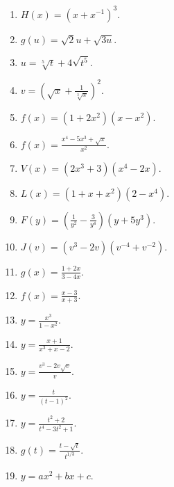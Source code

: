 \begin{problem}
\begin{multicols}{2}
\begin{enumerate}
\item $H(x)=(x+x^{-1})^3$.

\item $g(u)=\sqrt 2 u +\sqrt{3u}$.

\item $u=\sqrt[5]t+4\sqrt{t^5}$.

\item $v=\left(\sqrt{x}+\frac{1}{\sqrt[3]{x}}\right)^2$.


\answer{$ $}
\item $f(x)=(1+2x^2)(x-x^2)$.

\answer{$ $}
\item $f(x)=\frac{x^4-5x^3+\sqrt{x}}{x^2}$.

\answer{$ $}
\item $V(x)=(2x^3+3)(x^4-2x)$.

\answer{$ $}
\item $L(x)=(1+x+x^2)(2-x^4)$.

\answer{$ $}
\item $F(y)=\left(\frac{1}{y^2}-\frac{3}{y^4} \right)(y+5y^3)$.

\answer{$ $}
\item $J(v)=(v^3-2v)(v^{-4}+v^{-2})$.

\answer{$ $}
\item $g(x)=\frac{1+2x}{3-4x}$.

\answer{$ $}
\item $f(x)=\frac{x-3}{x+3}$.

\answer{$ $}
\item $y=\frac{x^3}{1-x^2}$.

\answer{$ $}
\item $y=\frac{x+1}{x^3+x-2}$.

\answer{$ $}
\item $y=\frac{v^3-2v\sqrt{v}}{v}$.

\answer{$ $}
\item $y=\frac{t}{(t-1)^2}$.

\answer{$ $}
\item $y=\frac{t^2+2}{t^4-3t^2+1}$.

\answer{$ $}
\item $g(t)=\frac{t-\sqrt{t}}{t^{1/3}}$.

\answer{$ $}
\item $y=a x^2+b x + c$.


\end{enumerate}
\end{multicols}
\end{problem}
